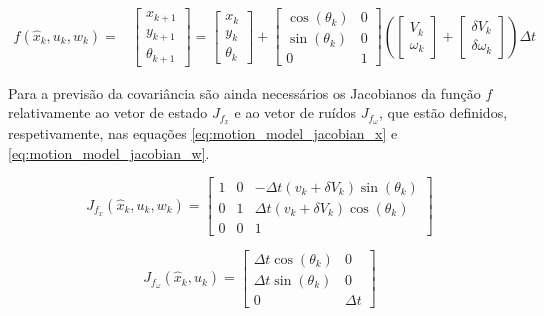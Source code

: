 \documentclass{article}
\begin{document}
\begin{equation}
    \begin{split}
        f(\hat{x}_k,u_k,w_k) =&
        \begin{bmatrix}
        x_{k+1} \\
        y_{k+1} \\
        \theta_{k+1} 
        \end{bmatrix} 
        = \begin{bmatrix}
        x_k \\
        y_k \\
        \theta_k
        \end{bmatrix} + 
        \begin{bmatrix}
        \cos(\theta_k) & 0 \\
        \sin(\theta_k) & 0 \\
        0 & 1
        \end{bmatrix} \left(
        \begin{bmatrix}
        V_k \\
        \omega_k
        \end{bmatrix} + 
        \begin{bmatrix}
        \delta V_k \\
        \delta \omega_k
        \end{bmatrix}
        \right) \Delta t 
    \end{split}
    \label{eq:motion_model}
\end{equation}

Para a previsão da covariância são ainda necessários os Jacobianos da função $f$ relativamente ao vetor de estado $J_{f_x}$ e ao vetor de ruídos $J_{f_\omega}$, que estão definidos, respetivamente, nas equações \ref{eq:motion_model_jacobian_x} e \ref{eq:motion_model_jacobian_w}.

\begin{equation}
    J_{f_x}(\hat{x}_k,u_k,w_k) = \left[\begin{matrix}1 & 0 & - \Delta t \left(v_{k} + \delta V_k \right) \sin{\left(\theta_{k} \right)}\\0 & 1 & \Delta t \left(v_{k} + \delta V_k \right) \cos{\left(\theta_{k} \right)}\\0 & 0 & 1\end{matrix}\right]
    \label{eq:motion_model_jacobian_x}
\end{equation}

\begin{equation}
    J_{f_\omega}(\hat{x}_k,u_k) = \left[\begin{matrix}\Delta t \cos{\left(\theta_{k} \right)} & 0\\ \Delta t \sin{\left(\theta_{k} \right)} & 0\\0 & \Delta t\end{matrix}\right]
    \label{eq:motion_model_jacobian_w}
\end{equation}
\end{document}
